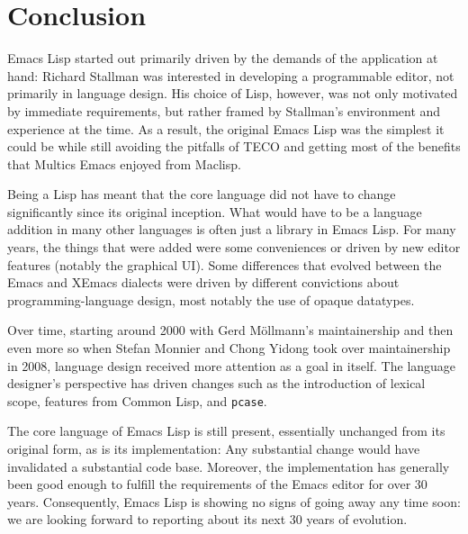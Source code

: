 \documentclass[format=acmsmall,screen]{acmart}
\newcommand \Elisp {Emacs Lisp}
\begin{document}

\section{Conclusion}
\label{sec:conclusion}


\Elisp{} started out primarily driven by the demands of the
application at hand: Richard Stallman was interested in developing a
programmable editor, not primarily in language design.  His choice of
Lisp, however, was not only motivated by immediate requirements, but
rather framed by Stallman's environment and experience at the time.  As
a result, the original \Elisp{} was the simplest it could be while
still avoiding the pitfalls of TECO and getting most of the benefits that
Multics Emacs enjoyed from Maclisp.

Being a Lisp has meant that the core language did not have to change
significantly since its original inception.  What would have to be a
language addition in many other languages is often just a library in \Elisp{}.
For many years, the
things that were added were some conveniences or driven by new editor
features (notably the graphical UI).  Some differences that evolved
between the Emacs and XEmacs dialects were driven by different
convictions about programming-language design, most notably the use of
opaque datatypes.

Over time, starting around 2000 with Gerd Möllmann's maintainership and then
even more so when Stefan Monnier and Chong Yidong took over maintainership
in 2008, language design received more attention as a goal in itself.
The language designer's perspective has driven changes such as the
introduction of lexical scope, features from Common Lisp, and
\texttt{pcase}.

The core language of \Elisp{} is still present, essentially unchanged
from its original form, as is its implementation:  Any substantial
change would have invalidated a substantial code base.  Moreover, the
implementation has generally been good enough to fulfill the
requirements of the Emacs editor for over 30 years.  Consequently,
\Elisp{} is showing no signs of going away any time soon: we are
looking forward to reporting about its next 30 years of evolution.

\end{document}
